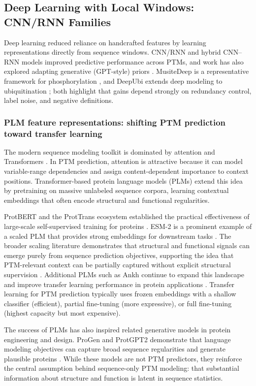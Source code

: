 \documentclass[conference]{IEEEtran}
\begin{document}
\subsection{Deep Learning with Local Windows: CNN/RNN Families}
Deep learning reduced reliance on handcrafted features by learning representations directly from sequence windows. CNN/RNN and hybrid CNN--RNN models improved predictive performance across PTMs, and work has also explored adapting generative (GPT-style) priors \cite{shrestha2024post}. MusiteDeep is a representative framework for phosphorylation \cite{wang2017musitedeep}, and DeepUbi extends deep modeling to ubiquitination \cite{fu2019deepubi}; both highlight that gains depend strongly on redundancy control, label noise, and negative definitions.

\subsubsection{PLM feature representations: shifting PTM prediction toward transfer learning}
The modern sequence modeling toolkit is dominated by attention and Transformers \cite{vaswani2017attention}. In PTM prediction, attention is attractive because it can model variable-range dependencies and assign content-dependent importance to context positions. Transformer-based protein language models (PLMs) extend this idea by pretraining on massive unlabeled sequence corpora, learning contextual embeddings that often encode structural and functional regularities.

ProtBERT and the ProtTrans ecosystem established the practical effectiveness of large-scale self-supervised training for proteins \cite{elnaggar2020,elnaggar2021prottranscrackinglanguagelifes}. ESM-2 is a prominent example of a scaled PLM that provides strong embeddings for downstream tasks \cite{lin2022}. The broader scaling literature demonstrates that structural and functional signals can emerge purely from sequence prediction objectives, supporting the idea that PTM-relevant context can be partially captured without explicit structural supervision \cite{rives2021scaling}. Additional PLMs such as Ankh continue to expand this landscape and improve transfer learning performance in protein applications \cite{elnaggar2023}.
Transfer learning for PTM prediction typically uses frozen embeddings with a shallow classifier (efficient), partial fine-tuning (more expressive), or full fine-tuning (highest capacity but most expensive).

The success of PLMs has also inspired related generative models in protein engineering and design. ProGen and ProtGPT2 demonstrate that language modeling objectives can capture broad sequence regularities and generate plausible proteins \cite{madani2020progen,ferruz2022protgpt2}. While these models are not PTM predictors, they reinforce the central assumption behind sequence-only PTM modeling: that substantial information about structure and function is latent in sequence statistics.
\end{document}
